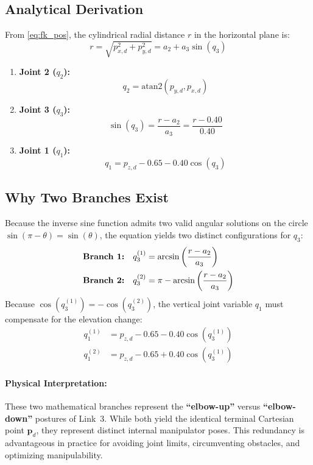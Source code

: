 \documentclass[11pt, a4paper]{article}
\begin{document}
\subsection{Analytical Derivation}
From \eqref{eq:fk_pos}, the cylindrical radial distance $r$ in the horizontal plane is:
\begin{equation}
    r = \sqrt{p_{x,d}^2 + p_{y,d}^2} = a_2 + a_3\sin(q_3)
\end{equation}
\begin{enumerate}
    \item \textbf{Joint 2 ($q_2$):}
    \begin{equation}
        q_2 = \text{atan2}(p_{y,d}, p_{x,d})
    \end{equation}
    \item \textbf{Joint 3 ($q_3$):}
    \begin{equation}
        \sin(q_3) = \frac{r - a_2}{a_3} = \frac{r - 0.40}{0.40}
    \end{equation}
    \item \textbf{Joint 1 ($q_1$):}
    \begin{equation}
        q_1 = p_{z,d} - 0.65 - 0.40\cos(q_3)
    \end{equation}
\end{enumerate}

\subsection{Why Two Branches Exist}
Because the inverse sine function admits two valid angular solutions on the circle $\sin(\pi - \theta) = \sin(\theta)$, the equation yields two distinct configurations for $q_3$:
\begin{align}
    \text{\textbf{Branch 1:}} \quad q_{3}^{(1)} &= \arcsin\left(\frac{r - a_2}{a_3}\right) \\
    \text{\textbf{Branch 2:}} \quad q_{3}^{(2)} &= \pi - \arcsin\left(\frac{r - a_2}{a_3}\right)
\end{align}
Because $\cos(q_3^{(1)}) = -\cos(q_3^{(2)})$, the vertical joint variable $q_1$ must compensate for the elevation change:
\begin{align}
    q_1^{(1)} &= p_{z,d} - 0.65 - 0.40\cos\left(q_3^{(1)}\right) \\
    q_1^{(2)} &= p_{z,d} - 0.65 + 0.40\cos\left(q_3^{(1)}\right)
\end{align}

\paragraph{Physical Interpretation:} These two mathematical branches represent the \textbf{``elbow-up''} versus \textbf{``elbow-down''} postures of Link~3. While both yield the identical terminal Cartesian point $\mathbf{p}_d$, they represent distinct internal manipulator poses. This redundancy is advantageous in practice for avoiding joint limits, circumventing obstacles, and optimizing manipulability.
\end{document}
